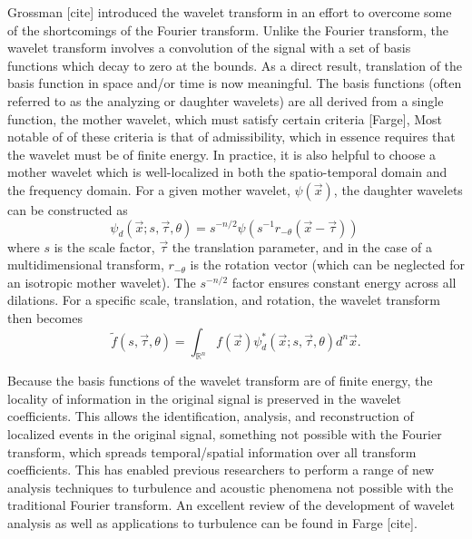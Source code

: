 Grossman [cite] introduced the wavelet transform in an effort to overcome some of the shortcomings of the Fourier transform.
Unlike the Fourier transform, the wavelet transform involves a convolution of the signal with a set of basis functions which decay to zero at the bounds.
As a direct result, translation of the basis function in space and/or time is now meaningful. 
The basis functions (often referred to as the analyzing or daughter wavelets) are all derived from a single function, the mother wavelet, which must satisfy certain criteria [Farge],
Most notable of of these criteria is that of admissibility, which in essence requires that the wavelet must be of finite energy. 
In practice, it is also helpful to choose a mother wavelet which is well-localized in both the spatio-temporal domain and the frequency domain. 
For a given mother wavelet, $\psi (\vec{x})$, the daughter wavelets can be constructed as
\begin{equation}
	\psi_d \left( \vec{x};s,\vec{\tau},\theta \right) = s^{-n/2} \psi \left( s^{-1} r_{-\theta} \left(\vec{x}-\vec{\tau} \right) \right) \
	\label{eq:daughter_wavelets}
\end{equation}
where $s$ is the scale factor, $\vec{\tau}$ the translation parameter, and in the case of a multidimensional transform, $r_{-\theta}$ is the rotation vector (which can be neglected for an isotropic mother wavelet). 
The $s^{-n/2}$ factor ensures constant energy across all dilations. 
For a specific scale, translation, and rotation, the wavelet transform then becomes
\begin{equation}
	\tilde{f} \left( s, \vec{\tau}, \theta \right) = \int_{\mathbb{R}^n} f \left( \vec{x} \right) \psi^*_d \left( \vec{x};s,\vec{\tau},\theta \right) d^n \vec{x}.
\end{equation}

Because the basis functions of the wavelet transform are of finite energy, the locality of information in the original signal is preserved in the wavelet coefficients. 
This allows the identification, analysis, and reconstruction of localized events in the original signal, something not possible with the Fourier transform, which spreads temporal/spatial information over all transform coefficients. 
This has enabled previous researchers to perform a range of new analysis techniques to turbulence and acoustic phenomena not possible with the traditional Fourier transform. An excellent review of the development of wavelet analysis as well as applications to turbulence can be found in Farge [cite].

